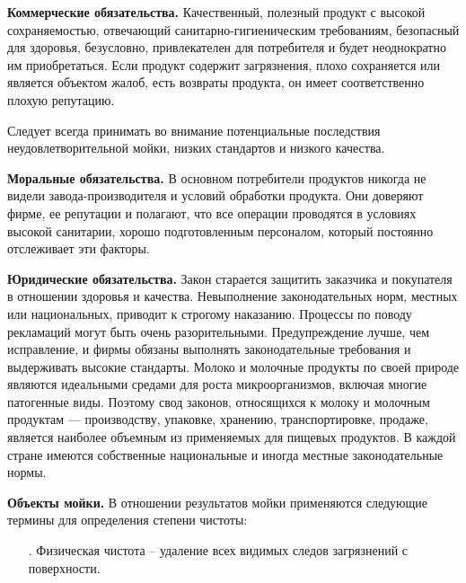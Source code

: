 {\begin{itemize}[leftmargin=2.15cm, labelwidth=0.65cm, labelsep=0.0cm]
	\setcounter{itemcntr}{1}
\end{itemize}

\par \redline \textbf{Коммерческие обязательства.} Качественный, полезный продукт с высокой сохраняемостью, отвечающий санитарно-гигиеническим требованиям, безопасный для здоровья, безусловно, привлекателен для потребителя и будет неоднократно им приобретаться. Если продукт содержит загрязнения, плохо сохраняется или является объектом жалоб, есть возвраты продукта, он имеет соответственно плохую репутацию.

\par \redline	Следует всегда принимать во внимание потенциальные последствия неудовлетворительной мойки, низких стандартов и низкого качества.

\par \redline \textbf{Моральные обязательства.} В основном потребители продуктов никогда не видели завода-производителя и условий обработки продукта. Они доверяют фирме, ее репутации и полагают, что все операции проводятся в условиях высокой санитарии, хорошо подготовленным персоналом, который постоянно отслеживает эти факторы.

\par \redline \textbf{Юридические обязательства.} Закон старается защитить заказчика и покупателя в отношении здоровья и качества. Невыполнение законодательных норм, местных или национальных, приводит к строгому наказанию. Процессы по поводу рекламаций могут быть очень разорительными. Предупреждение лучше, чем исправление, и фирмы обязаны выполнять законодательные требования и выдерживать высокие стандарты. Молоко и молочные продукты по своей природе являются идеальными средами для роста микроорганизмов, включая многие патогенные виды. Поэтому свод законов, относящихся к молоку и молочным продуктам — производству, упаковке, хранению, транспортировке, продаже, является наиболее объемным из применяемых для пищевых продуктов. В каждой стране имеются собственные национальные и иногда местные законодательные нормы.


\par \redline \textbf{Объекты мойки.} В отношении результатов мойки применяются следующие термины для определения
степени чистоты:

\begin{itemize}[leftmargin=2.15cm, labelwidth=0.65cm, labelsep=0.0cm] 
	
	\item[\theitemcntr. ] Физическая чистота {--} удаление всех видимых следов загрязнений с поверхности.
	\addtocounter{itemcntr}{1}
	

\end{itemize}}
